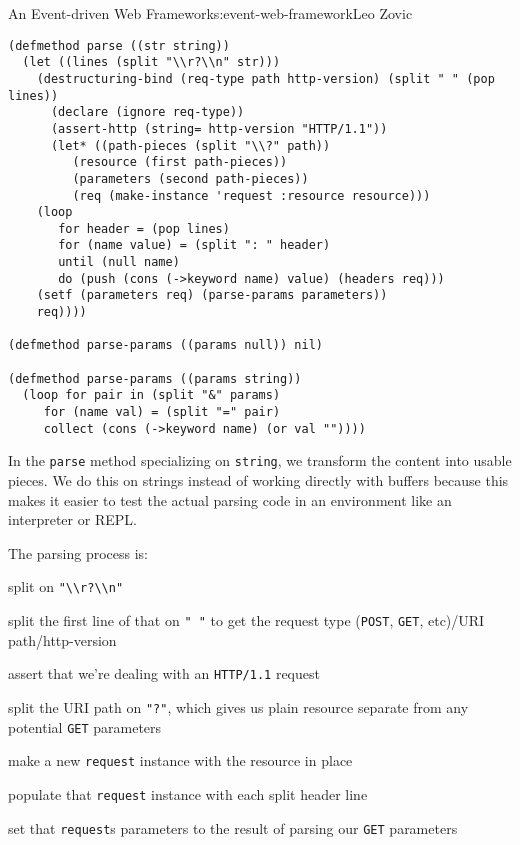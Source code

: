 \begin{aosachapter}{An Event-driven Web Framework}{s:event-web-framework}{Leo Zovic}
\begin{verbatim}
(defmethod parse ((str string))
  (let ((lines (split "\\r?\\n" str)))
    (destructuring-bind (req-type path http-version) (split " " (pop lines))
      (declare (ignore req-type))
      (assert-http (string= http-version "HTTP/1.1"))
      (let* ((path-pieces (split "\\?" path))
         (resource (first path-pieces))
         (parameters (second path-pieces))
         (req (make-instance 'request :resource resource)))
    (loop
       for header = (pop lines)
       for (name value) = (split ": " header)
       until (null name)
       do (push (cons (->keyword name) value) (headers req)))
    (setf (parameters req) (parse-params parameters))
    req))))

(defmethod parse-params ((params null)) nil)

(defmethod parse-params ((params string))
  (loop for pair in (split "&" params)
     for (name val) = (split "=" pair)
     collect (cons (->keyword name) (or val ""))))
\end{verbatim}

In the \texttt{parse} method specializing on \texttt{string}, we
transform the content into usable pieces. We do this on strings instead
of working directly with buffers because this makes it easier to test
the actual parsing code in an environment like an interpreter or REPL.

The parsing process is:

\begin{aosaenumerate}
\def\labelenumi{\arabic{enumi}.}

\item
  split on
  \texttt{"\textbackslash{}\textbackslash{}r?\textbackslash{}\textbackslash{}n"}
\item
  split the first line of that on \texttt{" "} to get the request type
  (\texttt{POST}, \texttt{GET}, etc)/URI path/http-version
\item
  assert that we're dealing with an \texttt{HTTP/1.1} request
\item
  split the URI path on \texttt{"?"}, which gives us plain resource
  separate from any potential \texttt{GET} parameters
\item
  make a new \texttt{request} instance with the resource in place
\item
  populate that \texttt{request} instance with each split header line
\item
  set that \texttt{request}s parameters to the result of parsing our
  \texttt{GET} parameters
\end{aosaenumerate}


\end{aosachapter}
